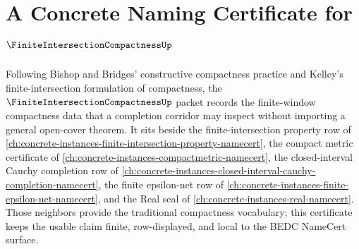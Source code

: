 \chapter{A Concrete Naming Certificate for $\FiniteIntersectionCompactnessUp$}
\label{ch:concrete-instances-finite-intersection-compactness-namecert}

Following Bishop and Bridges' constructive compactness practice and Kelley's finite-intersection formulation of compactness, the $\FiniteIntersectionCompactnessUp$ packet records the finite-window compactness data that a completion corridor may inspect without importing a general open-cover theorem. It sits beside the finite-intersection property row of \autoref{ch:concrete-instances-finite-intersection-property-namecert}, the compact metric certificate of \autoref{ch:concrete-instances-compactmetric-namecert}, the closed-interval Cauchy completion row of \autoref{ch:concrete-instances-closed-interval-cauchy-completion-namecert}, the finite epsilon-net row of \autoref{ch:concrete-instances-finite-epsilon-net-namecert}, and the Real seal of \autoref{ch:concrete-instances-real-namecert}. Those neighbors provide the traditional compactness vocabulary; this certificate keeps the usable claim finite, row-displayed, and local to the BEDC NameCert surface.

